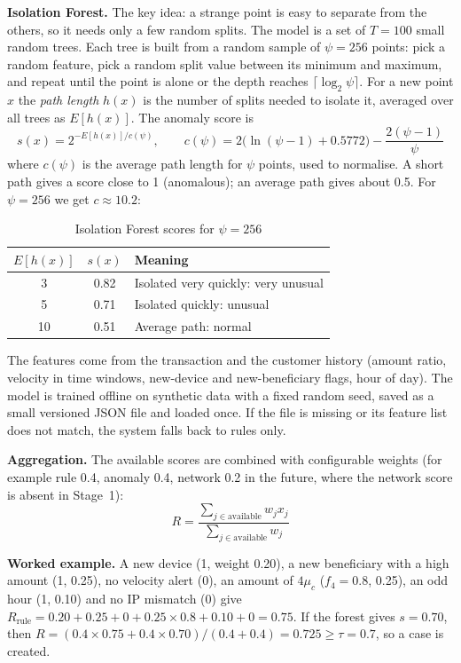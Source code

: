 \documentclass[oneside,a4paper,12pt]{report}
\begin{document}
\textbf{Isolation Forest.} The key idea: a strange point is easy to separate from the others, so it needs only a few random splits. The model is a set of $T=100$ small random trees. Each tree is built from a random sample of $\psi = 256$ points: pick a random feature, pick a random split value between its minimum and maximum, and repeat until the point is alone or the depth reaches $\lceil \log_2 \psi \rceil$. For a new point $x$ the \emph{path length} $h(x)$ is the number of splits needed to isolate it, averaged over all trees as $E[h(x)]$. The anomaly score is \cite{liu2008isolation}
\begin{equation}
  s(x) = 2^{-E[h(x)] / c(\psi)}, \qquad c(\psi) = 2\bigl(\ln(\psi-1) + 0.5772\bigr) - \frac{2(\psi-1)}{\psi}
\end{equation}
where $c(\psi)$ is the average path length for $\psi$ points, used to normalise. A short path gives a score close to 1 (anomalous); an average path gives about 0.5. For $\psi = 256$ we get $c \approx 10.2$:
\begin{table}[H]
\centering
\begin{tabular}{|c|c|l|}
\hline
$E[h(x)]$ & $s(x)$ & Meaning \\ \hline
3 & 0.82 & Isolated very quickly: very unusual \\ \hline
5 & 0.71 & Isolated quickly: unusual \\ \hline
10 & 0.51 & Average path: normal \\ \hline
\end{tabular}
\caption{Isolation Forest scores for $\psi = 256$}
\end{table}
The features come from the transaction and the customer history (amount ratio, velocity in time windows, new-device and new-beneficiary flags, hour of day). The model is trained offline on synthetic data with a fixed random seed, saved as a small versioned JSON file and loaded once. If the file is missing or its feature list does not match, the system falls back to rules only.

\textbf{Aggregation.} The available scores are combined with configurable weights (for example rule 0.4, anomaly 0.4, network 0.2 in the future, where the network score is absent in Stage~1):
\begin{equation}
  R = \frac{\sum_{j \in \text{available}} w_j x_j}{\sum_{j \in \text{available}} w_j}
\end{equation}

\textbf{Worked example.} A new device (1, weight 0.20), a new beneficiary with a high amount (1, 0.25), no velocity alert (0), an amount of $4\mu_c$ ($f_4 = 0.8$, 0.25), an odd hour (1, 0.10) and no IP mismatch (0) give
$R_{\mathrm{rule}} = 0.20 + 0.25 + 0 + 0.25 \times 0.8 + 0.10 + 0 = 0.75$.
If the forest gives $s = 0.70$, then $R = (0.4\times 0.75 + 0.4 \times 0.70)/(0.4+0.4) = 0.725 \ge \tau = 0.7$, so a case is created.
\end{document}

